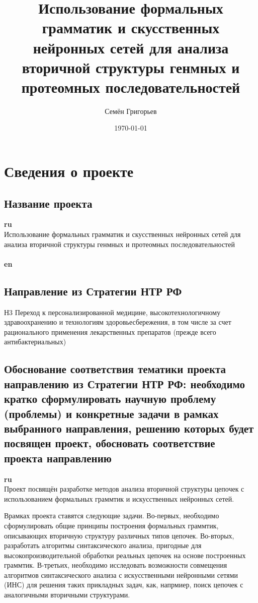 \documentclass[12pt]{article}  %
\title{Использование формальных грамматик и скусственных нейронных сетей для анализа вторичной структуры генмных и протеомных  последовательностей}
\author{Семён Григорьев}
\date{\today}
\theoremstyle{remark}
\begin{document}

\maketitle

\section{Сведения о проекте}

\subsection{Название проекта}

\textbf{ru}\\
Использование формальных грамматик и скусственных нейронных сетей для анализа вторичной структуры генмных и протеомных  последовательностей
\\
\\
\textbf{en}\\

\subsection{Направление из Стратегии НТР РФ}
Н3 Переход к персонализированной медицине, высокотехнологичному здравоохранению и технологиям здоровьесбережения, в том числе за счет рационального применения лекарственных препаратов (прежде всего антибактериальных)

\subsection{Обоснование соответствия тематики проекта направлению из Стратегии НТР РФ: необходимо кратко сформулировать научную проблему (проблемы) и конкретные задачи в рамках выбранного направления, решению которых будет посвящен проект, обосновать соответствие проекта направлению}
\textbf{ru}\\
Проект посвящён разработке методов анализа вторичной структуры цепочек с использованием формальных граммтик и искусственных нейронных сетей.

Врамках проекта ставятся следующие задачи.
Во-первых, необходимо сформулировать общие принципы построения формальных граммтик, описывающих вторичную структуру различных типов цепочек.
Во-вторых, разработать алгоритмы синтаксического анализа, пригодные для высокопроизводительной обработки реальных цепочек на основе построенных граммтик.
В-третьих, необходимо исследовать возможности совмещения алгоритмов синтаксического анализа с искусственными нейронными сетями (ИНС) для решения таких прикладных задач, как, напрмиер, поиск цепочек с аналогичными вторичными структурами.
\end{document}
